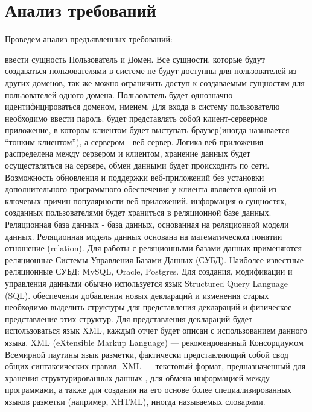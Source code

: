 \documentclass[14pt,a4paper]{reportmod}
\begin{document}
\section{Анализ требований}
Проведем анализ предъявленных требований:
\begin{enumerate}
   ввести сущность Пользователь и Домен. Все сущности, которые будут создаваться пользователями в системе не будут доступны для пользователей из других доменов, так же можно ограничить доступ к создаваемым сущностям для пользователей одного домена. Пользователь будет однозначно идентифицироваться доменом, именем. Для входа в систему пользователю необходимо ввести пароль.
   будет представлять собой клиент-серверное приложение, в котором клиентом будет выступать браузер(иногда называется ``тонким клиентом''), а сервером - веб-сервер. Логика веб-приложения распределена между сервером и клиентом, хранение данных будет осуществляться на сервере, обмен данными будет происходить по сети. Возможность обновления и поддержки веб-приложений без установки дополнительного программного обеспечения у клиента является одной из ключевых причин популярности веб приложений.
   информация о сущностях, созданных пользователями будет храниться в реляционной базе данных. Реляционная база данных - база данных, основанная на реляционной модели данных. Реляционная модель данных основана на математическом понятии отношение (relation). Для работы с реляционными базами данных применяются реляционные Системы Управления Базами Данных (СУБД). Наиболее известные реляционные СУБД: MySQL, Oracle, Postgres. Для создания, модификации и управления данными обычно используется язык Structured Query Language (SQL).
   обеспечения добавления новых деклараций и изменения старых необходимо выделить структуры для представления деклараций и физическое представление этих структур. Для представления деклараций будет использоваться язык XML, каждый отчет будет описан с использованием данного языка. XML (eXtensible Markup Language) — рекомендованный Консорциумом Всемирной паутины язык разметки, фактически представляющий собой свод общих синтаксических правил. XML — текстовый формат, предназначенный для хранения структурированных данных , для обмена информацией между программами, а также для создания на его основе более специализированных языков разметки (например, XHTML), иногда называемых словарями.
\begin{figure}
  \centering
  \begin{small}
    \begin{verbatim}

\end{verbatim}
\end{small}
\end{figure}
\end{enumerate}
\end{document}
